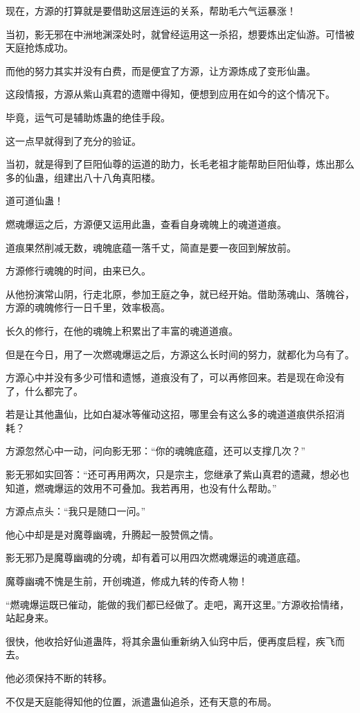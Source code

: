 \begin{this_body}
现在，方源的打算就是要借助这层连运的关系，帮助毛六气运暴涨！

当初，影无邪在中洲地渊深处时，就曾经运用这一杀招，想要炼出定仙游。可惜被天庭抢炼成功。

而他的努力其实并没有白费，而是便宜了方源，让方源炼成了变形仙蛊。

这段情报，方源从紫山真君的遗赠中得知，便想到应用在如今的这个情况下。

毕竟，运气可是辅助炼蛊的绝佳手段。

这一点早就得到了充分的验证。

当初，就是得到了巨阳仙尊的运道的助力，长毛老祖才能帮助巨阳仙尊，炼出那么多的仙蛊，组建出八十八角真阳楼。

道可道仙蛊！

燃魂爆运之后，方源便又运用此蛊，查看自身魂魄上的魂道道痕。

道痕果然削减无数，魂魄底蕴一落千丈，简直是要一夜回到解放前。

方源修行魂魄的时间，由来已久。

从他扮演常山阴，行走北原，参加王庭之争，就已经开始。借助荡魂山、落魄谷，方源的魂魄修行一日千里，效率极高。

长久的修行，在他的魂魄上积累出了丰富的魂道道痕。

但是在今日，用了一次燃魂爆运之后，方源这么长时间的努力，就都化为乌有了。

方源心中并没有多少可惜和遗憾，道痕没有了，可以再修回来。若是现在命没有了，什么都完了。

若是让其他蛊仙，比如白凝冰等催动这招，哪里会有这么多的魂道道痕供杀招消耗？

方源忽然心中一动，问向影无邪：“你的魂魄底蕴，还可以支撑几次？”

影无邪如实回答：“还可再用两次，只是宗主，您继承了紫山真君的遗藏，想必也知道，燃魂爆运的效用不可叠加。我若再用，也没有什么帮助。”

方源点点头：“我只是随口一问。”

他心中却是是对魔尊幽魂，升腾起一股赞佩之情。

影无邪乃是魔尊幽魂的分魂，却有着可以用四次燃魂爆运的魂道底蕴。

魔尊幽魂不愧是生前，开创魂道，修成九转的传奇人物！

“燃魂爆运既已催动，能做的我们都已经做了。走吧，离开这里。”方源收拾情绪，站起身来。

很快，他收拾好仙道蛊阵，将其余蛊仙重新纳入仙窍中后，便再度启程，疾飞而去。

他必须保持不断的转移。

不仅是天庭能得知他的位置，派遣蛊仙追杀，还有天意的布局。


\end{this_body}

